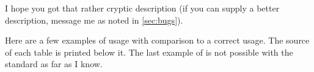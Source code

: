 I hope you got that rather cryptic description (if you can supply a better
description, message me as noted in \autoref{sec:bugs}).

Here are a few examples of usage with comparison to a correct  usage.
The source of each table is printed below it. The last example of 
is not possible with the standard  as far as I know.
\begin{multicols}{2}%
  \noindent
\vbox{}
\vbox{}
\end{multicols}%
\begin{multicols}{2}%
  \noindent
\vbox{}
\vbox{}
  \columnbreak
\vbox{}
\end{multicols}%

